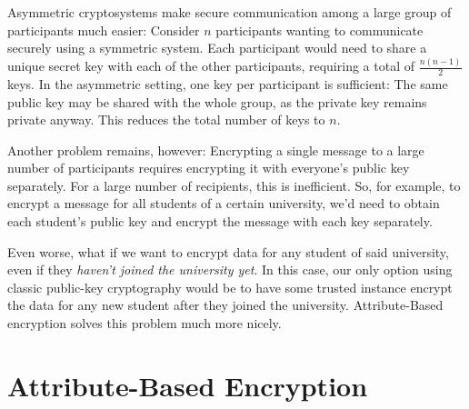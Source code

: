 Asymmetric cryptosystems make secure communication among a large group of participants much easier:
Consider $n$ participants wanting to communicate securely using a symmetric system.
Each participant would need to share a unique secret key with each of the other participants, requiring a total of $\frac{n(n-1)}{2}$ keys. In the asymmetric setting, one key per participant is sufficient:
The same public key may be shared with the whole group, as the private key remains private anyway. This reduces the total number of keys to $n$.

Another problem remains, however: Encrypting a single message to a large number of participants requires encrypting it with everyone's public key separately.
For a large number of recipients, this is inefficient.
So, for example, to encrypt a message for all students of a certain university, we'd need to obtain each student's public key and encrypt the message with each key separately.

Even worse, what if we want to encrypt data for any student of said university, even if they \emph{haven't joined the university yet}.
In this case, our only option using classic public-key cryptography would be to have some trusted instance encrypt the data for any new student after they joined the university.
Attribute-Based encryption solves this problem much more nicely. 

\section{Attribute-Based Encryption}

